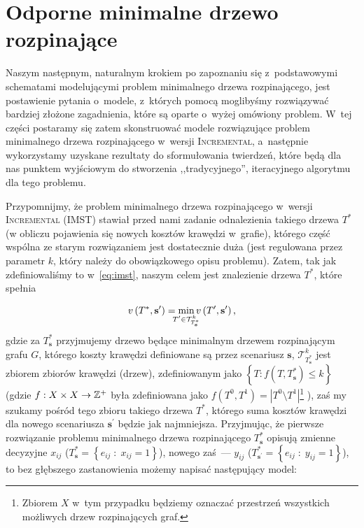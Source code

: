 \section{Odporne minimalne drzewo rozpinające}




Naszym następnym, naturalnym krokiem po zapoznaniu się z~podstawowymi schematami modelującymi problem minimalnego drzewa rozpinającego, jest postawienie pytania o~modele, z~których pomocą moglibyśmy rozwiązywać bardziej złożone zagadnienia, które są oparte o~wyżej omówiony problem.
W~tej części postaramy się zatem skonstruować modele rozwiązujące problem minimalnego drzewa rozpinającego w~wersji \textsc{Incremental}, a~następnie wykorzystamy uzyskane rezultaty do sformułowania twierdzeń, które będą dla nas punktem wyjściowym do stworzenia ,,tradycyjnego'', iteracyjnego algorytmu dla tego problemu.

Przypomnijmy, że problem minimalnego drzewa rozpinającego w~wersji \textsc{Incremental} (\textsc{IMST}) stawiał przed nami zadanie odnalezienia takiego drzewa $T^{\ast}$ (w obliczu pojawienia się nowych kosztów krawędzi w~grafie), którego część wspólna ze starym rozwiązaniem jest dostatecznie duża (jest regulowana przez parametr $k$, który należy do obowiązkowego opisu problemu).
Zatem, tak jak zdefiniowaliśmy to w~\ref{eq:imst}, naszym celem jest znalezienie drzewa $T^{\ast}$, które spełnia

\begin{equation}
	v \left( T^{\ast}, \textbf{s}^{\prime} \right) = \min_{\mathclap{T^{\prime} \in \mathcal{T}^{k}_{T^{\ast}_{\textbf{s}}}}} v \left( T^{\prime}, \textbf{s}^{\prime} \right)\text{,}
\end{equation}
gdzie za $T^{\ast}_{\textbf{s}}$ przyjmujemy drzewo będące minimalnym drzewem rozpinającym grafu $G$, którego koszty krawędzi definiowane są przez scenariusz $\textbf{s}$, $\mathcal{T}^{k}_{T^{\ast}_{\textbf{s}}}$ jest zbiorem zbiorów krawędzi (drzew), zdefiniowanym jako $\left\{ T : f \left( T, T^{\ast}_{\textbf{s}} \right) \leqslant k \right\}$ (gdzie $f: X \times X \rightarrow \mathbb{Z}^{+}$ była zdefiniowana jako $f \left( T^{0}, T^{1} \right) = \left| T^{0} \setminus T^{1} \right|$\footnote{
	Zbiorem $X$ w~tym przypadku będziemy oznaczać przestrzeń wszystkich możliwych drzew rozpinających graf.}
), zaś my szukamy pośród tego zbioru takiego drzewa $T^{\ast}$, którego suma kosztów krawędzi dla nowego scenariusza $\textbf{s}^{\prime}$ będzie jak najmniejsza.
Przyjmując, że pierwsze rozwiązanie problemu minimalnego drzewa rozpinającego $T^{\ast}_{\textbf{s}}$ opisują zmienne decyzyjne $x_{ij}$ ($T^{\ast}_{\textbf{s}} = \left\{ e_{ij} \; : \; x_{ij} = 1 \right\}$), nowego zaś~--- $y_{ij}$ ($T^{\ast}_{\textbf{s}^{\prime}} = \left\{ e_{ij} \; : \; y_{ij} = 1 \right\}$), to bez głębszego zastanowienia możemy napisać następujący model:


